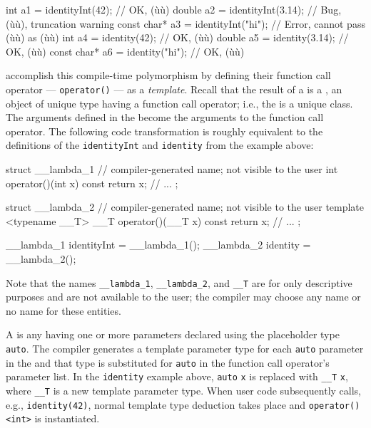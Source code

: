 \begin{emcppslisting}
int         a1 = identityInt(42);    // OK, (ù{}ù)
double      a2 = identityInt(3.14);  // Bug, (ù{}ù), truncation warning
const char* a3 = identityInt("hi");  // Error, cannot pass (ù{}ù) as (ù{}ù)
int         a4 = identity(42);       // OK, (ù{}ù)
double      a5 = identity(3.14);     // OK, (ù{}ù)
const char* a6 = identity("hi");     // OK, (ù{}ù)
\end{emcppslisting}
    

\noindent {} accomplish this compile-time polymorphism by
defining their function call operator --- \lstinline!operator()! --- as a
\emph{template}. Recall that the result of a  
is a , an object of unique type having a function
call operator; i.e., the  is a unique
 class. The arguments defined in the  become the arguments to the function call operator. The
following code transformation is roughly equivalent to the definitions
of the \lstinline!identityInt! and \lstinline!identity!  from the example above:

\begin{emcppslisting}
struct __lambda_1  // compiler-generated name; not visible to the user
{
    int operator()(int x) const { return x; }
    // ...
};

struct __lambda_2  // compiler-generated name; not visible to the user
{
    template <typename __T>
    __T operator()(__T x) const { return x; }
    // ...
};

__lambda_1 identityInt = __lambda_1();
__lambda_2 identity    = __lambda_2();
\end{emcppslisting}
    

\noindent Note that the names \lstinline!__lambda_1!, \lstinline!__lambda_2!, and
\lstinline!__T! are for only descriptive purposes and are not available
to the user; the compiler may choose any name or no name for these
entities.

A  is any  having one
or more parameters declared using the placeholder type \lstinline!auto!.
The compiler generates a template parameter type for each \lstinline!auto!
parameter in the  and that type is substituted
for \lstinline!auto! in the function call operator's parameter list. In the
\lstinline!identity! example above, \lstinline!auto! \lstinline!x! is replaced
with \lstinline!__T! \lstinline!x!, where \lstinline!__T! is a new template
parameter type. When user code subsequently calls, e.g.,
\lstinline!identity(42)!, normal template type deduction takes place and
\lstinline!operator()<int>! is instantiated.

